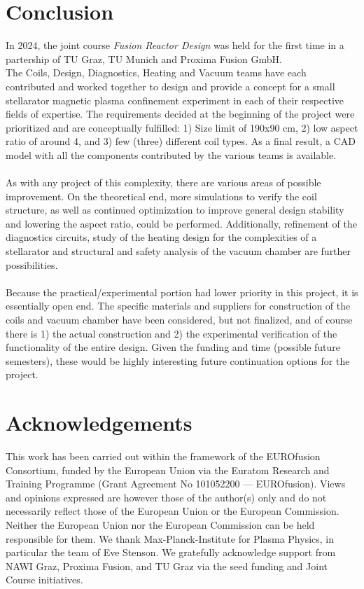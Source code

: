 \section{Conclusion}
In 2024, the joint course \textit{Fusion Reactor Design} was held for the first time in a partership of TU Graz, TU Munich and Proxima Fusion GmbH.
\\
The Coils, Design, Diagnostics, Heating and Vacuum teams have each contributed and worked together to design and provide a concept for a small stellarator magnetic plasma confinement experiment in each of their respective fields of expertise. The requirements decided at the beginning of the project were prioritized and are conceptually fulfilled: 1) Size limit of 190x90 cm, 2) low aspect ratio of around 4, and 3) few (three) different coil types. As a final result, a CAD model with all the components contributed by the various teams is available.\\
\\
As with any project of this complexity, there are various areas of possible improvement. On the theoretical end, more simulations to verify the coil structure, as well as continued optimization to improve general design stability and lowering the aspect ratio, could be performed. Additionally, refinement of the diagnostics circuits, study of the heating design for the complexities of a stellarator and structural and safety analysis of the vacuum chamber are further possibilities.\\
\\
Because the practical/experimental portion had lower priority in this project, it is essentially open end. The specific materials and suppliers for construction of the coils and vacuum chamber have been considered, but not finalized, and of course there is 1) the actual construction and 2) the experimental verification of the functionality of the entire design. Given the funding and time (possible future semesters), these would be highly interesting future continuation options for the project.

\section*{Acknowledgements} This work has been carried out within the framework of the EUROfusion Consortium, funded by the European Union via the Euratom Research and Training Programme (Grant Agreement No 101052200 — EUROfusion). Views and opinions expressed are however those of the author(s) only and do not necessarily reflect those of the European Union or the European Commission. Neither the European Union nor the European Commission can be held responsible for them. We thank Max-Planck-Institute for Plasma Physics, in particular the team of Eve Stenson. We gratefully acknowledge support from NAWI Graz, Proxima Fusion, and TU Graz via the seed funding and Joint Course initiatives.